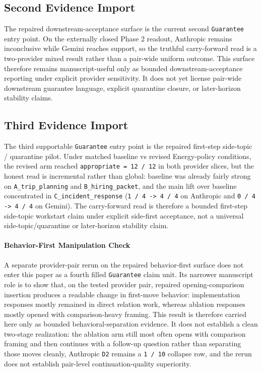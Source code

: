 \documentclass[11pt]{article}
\begin{document}
\subsection{Second Evidence Import}

The repaired downstream-acceptance surface is the current second
\texttt{Guarantee} entry point. On the externally closed Phase 2 readout,
Anthropic remains inconclusive while Gemini reaches support, so the truthful
carry-forward read is a two-provider mixed result rather than a pair-wide
uniform outcome. This surface therefore remains manuscript-useful only as
bounded downstream-acceptance reporting under explicit provider sensitivity. It
does not yet license pair-wide downstream guarantee language, explicit
quarantine closure, or later-horizon stability claims.

\subsection{Third Evidence Import}

The third supportable \texttt{Guarantee} entry point is the repaired first-step
side-topic / quarantine pilot. Under matched baseline vs revised Energy-policy
conditions, the revised arm reached \texttt{appropriate = 12 / 12} in both
provider slices, but the honest read is incremental rather than global:
baseline was already fairly strong on \texttt{A\_trip\_planning} and
\texttt{B\_hiring\_packet}, and the main lift over baseline concentrated in
\texttt{C\_incident\_response} (\texttt{1 / 4 -> 4 / 4} on Anthropic and
\texttt{0 / 4 -> 4 / 4} on Gemini). The carry-forward read is therefore a
bounded first-step side-topic workstart claim under explicit side-first
acceptance, not a universal side-topic/quarantine or later-horizon stability
claim.

\paragraph{Behavior-First Manipulation Check}

A separate provider-pair rerun on the repaired behavior-first surface does not
enter this paper as a fourth filled \texttt{Guarantee} claim unit. Its narrower
manuscript role is to show that, on the tested provider pair, repaired
opening-comparison insertion produces a readable change in first-move behavior:
implementation responses mostly remained in direct relation work, whereas
ablation responses mostly opened with comparison-heavy framing. This result is
therefore carried here only as bounded behavioral-separation evidence. It does
not establish a clean two-stage realization: the ablation arm still most often
opens with comparison framing and then continues with a follow-up question
rather than separating those moves cleanly, Anthropic \texttt{D2} remains a
\texttt{1 / 10} collapse row, and the rerun does not establish pair-level
continuation-quality superiority.
\end{document}
